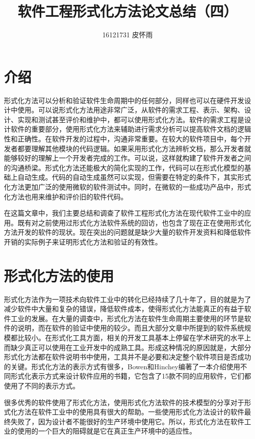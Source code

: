 \documentclass{article}
\author{16121731 皮怀雨}
\title{软件工程形式化方法论文总结（四）}
\begin{document}
\begin{CJK}{UTF8}{gbsn}
\maketitle
\begin{spacing}{1.4}
\renewcommand{\CJKglue}{\hskip 0.5pt}

\section{介绍}

形式化方法可以分析和验证软件生命周期中的任何部分，同样也可以在硬件开发设计中使用。可以说形式化方法用途非常广泛，从软件的需求工程、表示、架构、设计、实现和测试甚至评价和维护中，都可以使用形式化方法。软件的需求工程是设计软件的重要部分，使用形式化方法来辅助进行需求分析可以提高软件文档的逻辑性和正确性。在软件开发的过程中，沟通非常重要。在较大的软件项目中，每个开发者都要理解其他模块的代码逻辑。如果采用形式化方法辨析文档，那么开发者就能够较好的理解上一个开发者完成的工作。可以说，这样就构建了软件开发者之间的沟通桥梁。形式化方法还能极大的简化实现的工作，代码可以在形式化模型的基础上自动生成。代码的自动生成虽然可以实现，但需要在特定的条件下，其实形式化方法更加广泛的使用微软的软件测试中。同时，在微软的一些成功产品中，形式化方法也用来维护和评价旧的软件代码。

在这篇文章中，我们主要总结和调查了软件工程形式化方法在现代软件工业中的应用。既有对之前使用过形式化方法软件系统的回访，也包含了现在正在使用形式化方法开发的软件的现状。现在突出的问题就是缺少大量的软件开发资料和降低软件开销的实际例子来证明形式化方法和验证的有效性。

\section{形式化方法的使用}
形式化方法作为一项技术向软件工业中的转化已经持续了几十年了，目的就是为了减少软件中大量和复杂的错误，降低软件成本，使得形式化方法能真正的有益于软件工业的发展。在大量的调查中，形式化方法在软件生命周期主要使用的环节是软件的说明，而在软件的验证中使用的较少。而且大部分文章中所提到的软件系统规模都比较小。在形式化工具方面，相关的开发工具基本上停留在学术研究的水平上而缺少真正可以使用在工业开发中的成熟工具。形成这种情况的原因就是，大部分形式化方法都在软件说明书中使用，工具并不是必要和决定整个软件项目是否成功的关键。形式化方法的表示方式有很多，Bowen和Hinchey编著了一本介绍使用不同形式化表示方式来设计软件应用的书籍，它包含了15款不同的应用软件，它们都使用了不同的表示方式。

很多优秀的软件使用了形式化方法，使用形式化方法软件的技术模型的分享对于形式化方法在软件工业中的使用具有很大的帮助。一些使用形式化方法设计的软件最终失败了，因为设计者不能很好的生产环境中使用它。所以，形式化方法在软件工业的使用的一个巨大的阻碍就是它在真正生产环境中的适应性。


\end{spacing}
\end{CJK}
\end{document}
